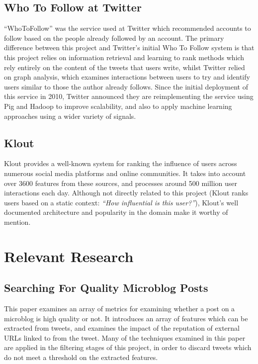 \documentclass{l4proj}
\begin{document}
\subsection{Who To Follow at Twitter}
``WhoToFollow'' was the service used at Twitter which recommended accounts to follow based on the people already followed by an account. The primary difference between this project and Twitter's initial Who To Follow system is that this project relies on information retrieval and learning to rank methods which rely entirely on the content of the tweets that users write, whilst Twitter relied on graph analysis, which examines interactions between users to try and identify users similar to those the author already follows. Since the initial deployment of this service in 2010, Twitter announced they are reimplementing the service using Pig and Hadoop to improve scalability, and also to apply machine learning approaches using a wider variety of signals.

\subsection{Klout}
Klout provides a well-known system for ranking the influence of users across numerous social media platforms and online communities. It takes into account over 3600 features from these sources, and processes around 500 million user interactions each day. Although not directly related to this project (Klout ranks users based on a static context: \textit{``How influential is this user?''}), Klout's well documented architecture and popularity in the domain make it worthy of mention.

\section{Relevant Research}

    \subsection{Searching For Quality Microblog Posts}
    This paper examines an array of metrics for examining whether a post on a microblog is high quality or not. It introduces an array of features which can be extracted from tweets, and examines the impact of the reputation of external URLs linked to from the tweet. Many of the techniques examined in this paper are applied in the filtering stages of this project, in order to discard tweets which do not meet a threshold on the extracted features.
\end{document}
